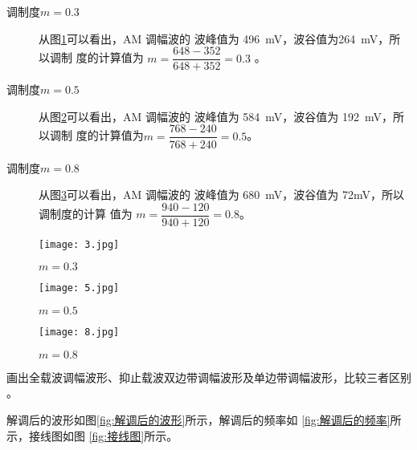 \documentclass[../main]{subfiles}
\begin{document}
\begin{Answer}

	\begin{description}

		\item[调制度$ m = 0.3 $] 从图\ref{fig:0.3}可以看出，AM 调幅波的
			波峰值为 \SI{496}{\mV}，波谷值为\SI{264}{\mV}，所以调制
			度的计算值为 $ m = \dfrac{648 - 352}{648 + 352} = 0.3 $
			。

		\item[调制度$ m = 0.5 $] 从图\ref{fig:0.5}可以看出，AM 调幅波的
			波峰值为 \SI{584}{\mV}，波谷值为 \SI{192}{\mV}，所以调制
			度的计算值为$ m = \dfrac{768 - 240}{768 + 240} = 0.5 $。

		\item[调制度$ m = 0.8 $] 从图\ref{fig:0.8}可以看出，AM 调幅波的
			波峰值为 \SI{680}{\mV}，波谷值为 72mV，所以调制度的计算
			值为 $ m = \dfrac{940 - 120}{940 + 120} = 0.8 $。

	\end{description}

\end{Answer}

\begin{figure}[htbp]
	\centering
	\texttt{[image: 3.jpg]}
	\caption{$ m = 0.3 $}
	\label{fig:0.3}
\end{figure}

\begin{figure}[htbp]
	\centering
	\texttt{[image: 5.jpg]}
	\caption{$ m = 0.5 $}
	\label{fig:0.5}
\end{figure}

\begin{figure}[htbp]
	\centering
	\texttt{[image: 8.jpg]}
	\caption{$ m = 0.8 $}
	\label{fig:0.8}
\end{figure}

\begin{Exercise}

	画出全载波调幅波形、抑止载波双边带调幅波形及单边带调幅波形，比较三者区别
	。

\end{Exercise}

\begin{Answer}

	解调后的波形如图\ref{fig:解调后的波形}所示，解调后的频率如
	\ref{fig:解调后的频率}所示，接线图如图 \ref{fig:接线图}所示。

\end{Answer}
\end{document}
